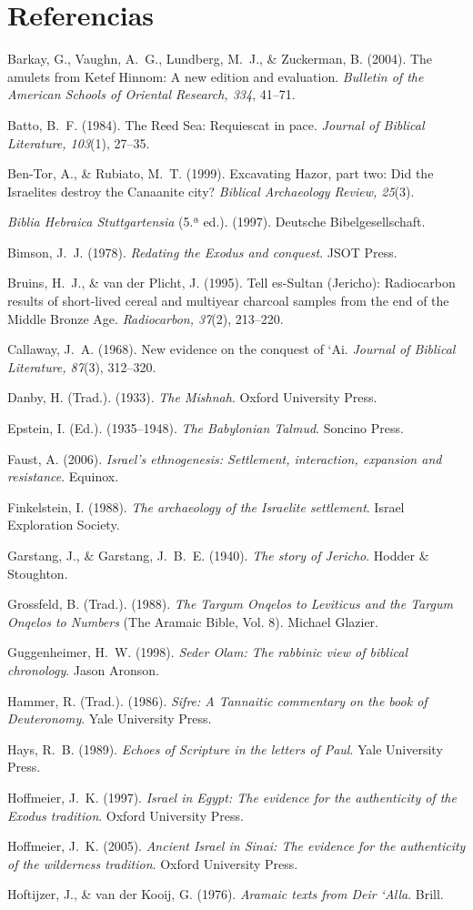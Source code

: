 \documentclass[11pt,letterpaper]{article}
\newcommand{\refapa}[1]{\par{\RaggedRight\hangindent=1.27cm\hangafter=1\noindent #1\par}\vspace{4pt}}
\begin{document}
\section*{Referencias}
{\small
\refapa{Barkay, G., Vaughn, A.~G., Lundberg, M.~J., \& Zuckerman, B. (2004). The amulets from Ketef Hinnom: A new edition and evaluation. \emph{Bulletin of the American Schools of Oriental Research, 334}, 41--71.}
\refapa{Batto, B.~F. (1984). The Reed Sea: Requiescat in pace. \emph{Journal of Biblical Literature, 103}(1), 27--35.}
\refapa{Ben-Tor, A., \& Rubiato, M.~T. (1999). Excavating Hazor, part two: Did the Israelites destroy the Canaanite city? \emph{Biblical Archaeology Review, 25}(3).}
\refapa{\emph{Biblia Hebraica Stuttgartensia} (5.ª ed.). (1997). Deutsche Bibelgesellschaft.}
\refapa{Bimson, J.~J. (1978). \emph{Redating the Exodus and conquest}. JSOT Press.}
\refapa{Bruins, H.~J., \& van der Plicht, J. (1995). Tell es-Sultan (Jericho): Radiocarbon results of short-lived cereal and multiyear charcoal samples from the end of the Middle Bronze Age. \emph{Radiocarbon, 37}(2), 213--220.}
\refapa{Callaway, J.~A. (1968). New evidence on the conquest of `Ai. \emph{Journal of Biblical Literature, 87}(3), 312--320.}
\refapa{Danby, H. (Trad.). (1933). \emph{The Mishnah}. Oxford University Press.}
\refapa{Epstein, I. (Ed.). (1935--1948). \emph{The Babylonian Talmud}. Soncino Press.}
\refapa{Faust, A. (2006). \emph{Israel's ethnogenesis: Settlement, interaction, expansion and resistance}. Equinox.}
\refapa{Finkelstein, I. (1988). \emph{The archaeology of the Israelite settlement}. Israel Exploration Society.}
\refapa{Garstang, J., \& Garstang, J.~B.~E. (1940). \emph{The story of Jericho}. Hodder \& Stoughton.}
\refapa{Grossfeld, B. (Trad.). (1988). \emph{The Targum Onqelos to Leviticus and the Targum Onqelos to Numbers} (The Aramaic Bible, Vol. 8). Michael Glazier.}
\refapa{Guggenheimer, H.~W. (1998). \emph{Seder Olam: The rabbinic view of biblical chronology}. Jason Aronson.}
\refapa{Hammer, R. (Trad.). (1986). \emph{Sifre: A Tannaitic commentary on the book of Deuteronomy}. Yale University Press.}
\refapa{Hays, R.~B. (1989). \emph{Echoes of Scripture in the letters of Paul}. Yale University Press.}
\refapa{Hoffmeier, J.~K. (1997). \emph{Israel in Egypt: The evidence for the authenticity of the Exodus tradition}. Oxford University Press.}
\refapa{Hoffmeier, J.~K. (2005). \emph{Ancient Israel in Sinai: The evidence for the authenticity of the wilderness tradition}. Oxford University Press.}
\refapa{Hoftijzer, J., \& van der Kooij, G. (1976). \emph{Aramaic texts from Deir `Alla}. Brill.}
}
\end{document}
